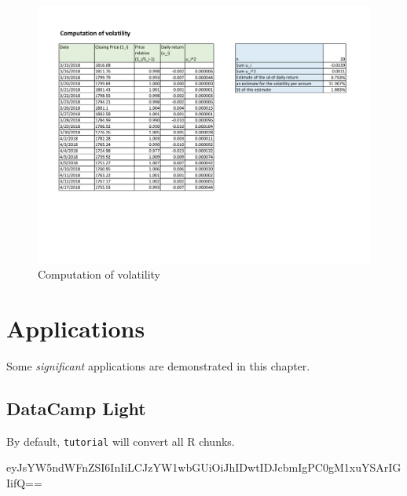 \documentclass[
]{book}
\theoremstyle{definition}
\theoremstyle{definition}
\theoremstyle{definition}
\theoremstyle{definition}
\theoremstyle{remark}
\begin{document}
\begin{figure}
\hypertarget{fig:volatility}{%
\centering
\includegraphics[width=7in,height=\textheight]{VolatilityEstimation2.pdf}
\caption{Computation of volatility}\label{fig:volatility}
}
\end{figure}

\hypertarget{applications}{%
\chapter{Applications}\label{applications}}

Some \emph{significant} applications are demonstrated in this chapter.

\hypertarget{datacamp-light}{%
\section{DataCamp Light}\label{datacamp-light}}

By default, \texttt{tutorial} will convert all R chunks.

eyJsYW5ndWFnZSI6InIiLCJzYW1wbGUiOiJhIDwtIDJcbmIgPC0gM1xuYSArIGIifQ==

  
\end{document}
